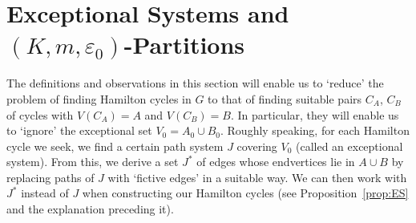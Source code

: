 \documentclass{memo-l}
\def\eps{\varepsilon}
\numberwithin{section}{chapter}
\numberwithin{equation}{section}
\numberwithin{firstthm}{section}
\numberwithin{figure}{section}
\begin{document}

\section{Exceptional Systems and $(K,m,\eps_0)$-Partitions}\label{sec:BES}

The definitions and observations in this section will enable us to `reduce' the problem of 
finding Hamilton cycles in $G$ to that of finding suitable pairs $C_A$, $C_B$ of cycles with $V(C_A)=A$ and $V(C_B)=B$.
In particular, they will enable us to `ignore' the exceptional set $V_0=A_0 \cup B_0$.
Roughly speaking, for each Hamilton cycle we seek, we find a certain path system $J$  covering $V_0$
(called an exceptional system). From this, we derive a set $J^*$ of edges whose endvertices lie in $A \cup B$
by replacing paths of $J$ with `fictive edges' in a suitable way. We can then work with $J^*$ instead of $J$
when constructing our Hamilton cycles (see Proposition~\ref{prop:ES} and the explanation preceding it).
\end{document}
